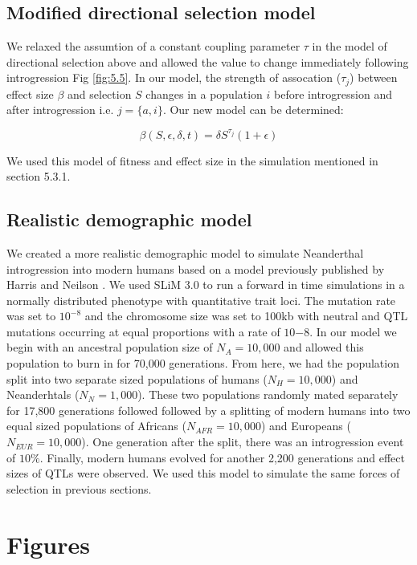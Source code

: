 \subsection{Modified directional selection model}
We relaxed the assumtion of a constant coupling parameter $\tau$ in the model of directional selection above and allowed the value to change immediately following introgression Fig \ref{fig:5.5}. In our model, the strength of assocation ($\tau_j$) between effect size $\beta$ and selection $S$ changes in a population $i$ before introgression and after introgression i.e. $j = \{a,i\}$. Our new model can be determined:  

$$\beta(S,\epsilon,\delta,t) = \delta S^{\tau_j}(1+\epsilon)$$

We used this model of fitness and effect size in the simulation mentioned in section 5.3.1.

\subsection{Realistic demographic model}
We created a more realistic demographic model to simulate Neanderthal introgression into modern humans based on a model previously published by Harris and Neilson \cite{harris2016genetic}. We used SLiM 3.0 \cite{haller2019slim} to run a forward in time simulations in a normally distributed phenotype with quantitative trait loci. The mutation rate was set to $10^{-8}$ and the chromosome size was set to 100kb with neutral and QTL mutations occurring at equal proportions with a rate of $10{-8}$. In our model we begin with an ancestral population size of $N_A = 10,000$ and allowed this population to burn in for 70,000 generations. From here, we had the population split into two separate sized populations of humans ($N_H = 10,000$) and Neanderhtals ($N_N = 1,000$). These two populations randomly mated separately for 17,800 generations followed followed by a splitting of modern humans into two equal sized populations of Africans ($N_{AFR} = 10,000$) and Europeans ($N_{EUR} = 10,000$). One generation after the split, there was an introgression event of $10\%$. Finally, modern humans evolved for another 2,200 generations and effect sizes of QTLs were observed. We used this model to simulate the same forces of selection in previous sections. 

\newpage
\section{Figures}

